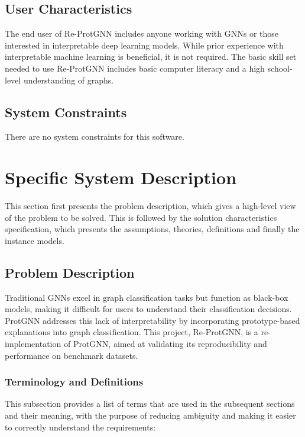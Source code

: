 \documentclass[12pt]{article}
\begin{document}
\subsection{User Characteristics} \label{SecUserCharacteristics}

The end user of Re-ProtGNN includes anyone working with GNNs or those interested in interpretable deep learning models. While prior experience with interpretable machine learning is beneficial, it is not required. The basic skill set needed to use Re-ProtGNN includes basic computer literacy and a high school-level understanding of graphs.




\subsection{System Constraints}

There are no system constraints for this software.

\section{Specific System Description}

This section first presents the problem description, which gives a high-level
view of the problem to be solved.  This is followed by the solution characteristics
specification, which presents the assumptions, theories, definitions and finally
the instance models.

\subsection{Problem Description} \label{Sec_pd}
Traditional GNNs excel in graph classification tasks but function as black-box models, making it difficult for users to understand their classification decisions. ProtGNN addresses this lack of interpretability by incorporating prototype-based explanations into graph classification. This project, Re-ProtGNN, is a re-implementation of ProtGNN, aimed at validating its reproducibility and performance on benchmark datasets.


\subsubsection{Terminology and  Definitions}

This subsection provides a list of terms that are used in the subsequent
sections and their meaning, with the purpose of reducing ambiguity and making it
easier to correctly understand the requirements:
\end{document}
